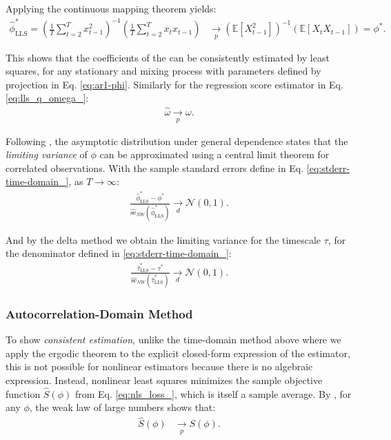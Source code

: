 \documentclass[docs/main.tex]{subfiles}
\begin{document}
\noindent Applying the continuous mapping theorem yields:
\begin{align}
    \hat\phi^*_{\scriptscriptstyle\text{LLS}} = \left(\frac{1}{T} \sum_{t=2}^T x_{t-1}^2\right)^{-1} \left( \frac{1}{T} \sum_{t=2}^T x_t x_{t-1}\right) &\underset{p}{\to} (\mathbb{E}[X_{t-1}^2])^{-1}(\mathbb{E}[X_t X_{t-1}]) = \phi^*.
\end{align}

\noindent This shows that the coefficients of the  can be consistently estimated by least squares, for any stationary and mixing process with parameters defined by projection in Eq. \eqref{eq:ar1-phi}. Similarly for the regression score estimator in Eq. \eqref{eq:lls_q_omega_}:
\begin{align}
    \hat \omega \underset{p}{\to} \omega.
\end{align}

Following \citet[Theorem~14.33]{hansen_econometrics_2022}, the asymptotic distribution under general dependence states that the \textit{limiting variance} of $\phi$ can be approximated using a central limit theorem for correlated observations. With the sample standard errors define in Eq. \eqref{eq:stderr-time-domain_}, as $T\to\infty$:
\begin{align} \label{eq:ar1-phi-clt}
\frac{\hat\phi^*_{\scriptscriptstyle\text{LLS}} - \phi^*}{\widehat{\text{se}}_{NW}(\hat\phi^*_{\scriptscriptstyle\text{LLS}})} \underset{d}{\to} \mathcal{N}(0, 1).
\end{align}

\noindent And by the delta method we obtain the limiting variance for the timescale $\tau$, for the denominator defined in \eqref{eq:stderr-time-domain_}:
\begin{align}
    \frac{\hat{\tau}^*_{\scriptscriptstyle\text{LLS}} - \tau^*}{\widehat{\text{se}}_{NW}(\hat{\tau}^*_{\scriptscriptstyle\text{LLS}}) } \underset{d}{\to} \mathcal{N}(0,1).
\end{align}



\subsubsection{Autocorrelation-Domain Method}

To show \textit{consistent estimation}, unlike the time-domain method above where we apply the ergodic theorem to the explicit closed-form expression of the estimator, this is not possible for nonlinear estimators because there is no algebraic expression. Instead, nonlinear least squares minimizes the sample objective function $\widehat{S}(\phi)$ from Eq. \eqref{eq:nls_loss_}, which is itself a sample average. By \citet[Theorem~22.1]{hansen_econometrics_2022}, for any $\phi$, the weak law of large numbers shows that:
\begin{align}
\widehat{S}(\phi) &\underset{p}{\to} S(\phi).
\end{align}
\end{document}
